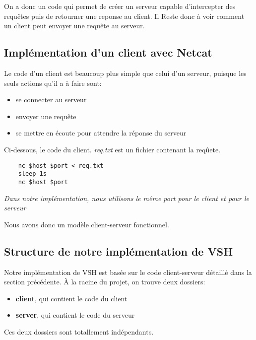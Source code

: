 \documentclass[titlepage]{article}
\begin{document}
	On a donc un code qui permet de créer un serveur capable d'intercepter des requêtes puis de retourner une reponse au client. Il Reste donc à voir comment un client peut envoyer une requête au serveur.

	\subsection{Implémentation d'un client avec Netcat}
	Le code d'un client est beaucoup plus simple que celui d'un serveur, puisque les seuls actions qu'il a à faire sont:
	\begin{itemize}  
		\item se connecter au serveur 
		\item envoyer une requête
		\item se mettre en écoute pour attendre la réponse du serveur
	\end{itemize}

	Ci-dessous, le code du client. \textit{req.txt} est un fichier contenant la reqûete. 

	\begin{lstlisting}
	nc $host $port < req.txt
	sleep 1s
	nc $host $port
	\end{lstlisting}

	\textit{Dans notre implémentation, nous utilisons le même port pour le client et pour le serveur} 

	Nous avons donc un modèle client-serveur fonctionnel.

	\subsection{Structure de notre implémentation de VSH}
	Notre implémentation de VSH est basée sur le code client-serveur détaillé dans la section précédente.
	À la racine du projet, on trouve deux dossiers:
	\begin{itemize}  
		\item \textbf{client}, qui contient le code du client 
		\item \textbf{server}, qui contient le code du serveur
	\end{itemize}
	Ces deux dossiers sont totallement indépendants.
\end{document}
